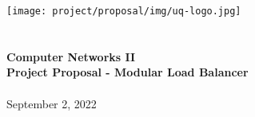 \begin{titlepage}
\center
\texttt{[image: project/proposal/img/uq-logo.jpg]} \\[1.5cm]
\HRule \\[0.4cm]
{ \Huge \bfseries \coursecode \\ Computer Networks II \ \\[0.25cm] 
\huge Project Proposal - Modular Load Balancer} \\[0.4cm]
\HRule \\[1.5cm]
\theauthor
September 2, 2022 \\ [1cm]
\restoregeometry
\end{titlepage}